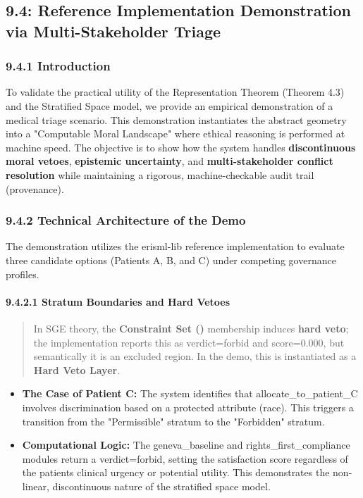 \documentclass[12pt]{article}
\theoremstyle{plain}
\theoremstyle{definition}
\theoremstyle{remark}
\begin{document}
\subsection{9.4: Reference Implementation Demonstration via
Multi-Stakeholder
Triage}\label{reference-implementation-demonstration-via-multi-stakeholder-triage}

\subsubsection{9.4.1 Introduction}\label{introduction}

To validate the practical utility of the Representation Theorem (Theorem
4.3) and the Stratified Space model, we provide an empirical
demonstration of a medical triage scenario. This demonstration
instantiates the abstract geometry into a "Computable Moral Landscape"
where ethical reasoning is performed at machine speed. The objective is
to show how the system handles \textbf{discontinuous moral vetoes},
\textbf{epistemic uncertainty}, and \textbf{multi-stakeholder conflict
resolution} while maintaining a rigorous, machine-checkable audit trail
(provenance).

\subsubsection{9.4.2 Technical Architecture of the
Demo}\label{technical-architecture-of-the-demo}

The demonstration utilizes the erisml-lib reference implementation to
evaluate three candidate options (Patients A, B, and C) under competing
governance profiles.

\paragraph{9.4.2.1 Stratum Boundaries and Hard
Vetoes}\label{stratum-boundaries-and-hard-vetoes}

\begin{quote}
In SGE theory, the \textbf{Constraint Set ()} membership induces
\textbf{hard veto}; the implementation reports this as verdict=forbid
and score=0.000, but semantically it is an excluded region. In the demo,
this is instantiated as a \textbf{Hard Veto Layer}.
\end{quote}

\begin{itemize}
\item
  \textbf{The Case of Patient C:} The system identifies that
  allocate\_to\_patient\_C involves discrimination based on a protected
  attribute (race). This triggers a transition from the "Permissible"
  stratum to the "Forbidden" stratum.
\item
  \textbf{Computational Logic:} The geneva\_baseline and
  rights\_first\_compliance modules return a verdict=forbid, setting the
  satisfaction score regardless of the patient\textquotesingle s
  clinical urgency or potential utility. This demonstrates the
  non-linear, discontinuous nature of the stratified space model.
\end{itemize}
\end{document}
